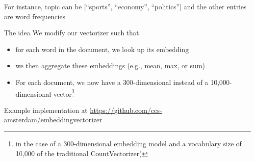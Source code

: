 \begin{frame}[plain]
        	\begin{table}[]
		\raggedright	
		For instance, topic can be [``sports'', ``economy'', ``politics''] and the other entries are word frequencies
	\end{table}
\end{frame}



\begin{frame}{The idea}
  We modify our vectorizer such that
  \begin{itemize}[<+->]
  \item for each word in the document, we look up its embedding
  \item we then aggregate these embeddings (e.g., mean, max, or sum)
  \item For each document, we now have a 300-dimensional instead of a 10,000-dimensional vector\footnote{in the case of a 300-dimensional embedding model and a vocabulary size of 10,000 of the traditional CountVectorizer)}
  \end{itemize}
\tiny{Example implementation at \url{https://github.com/ccs-amsterdam/embeddingvectorizer}}	
\end{frame}



